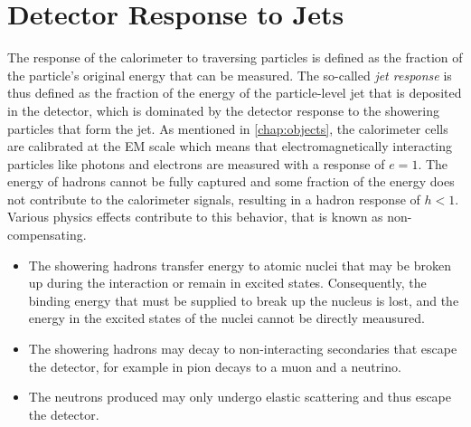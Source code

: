 




\section{Detector Response to Jets}
\label{sec:detector-response}
The response of the calorimeter to traversing particles is defined as the fraction of the particle's original energy that can be measured. The so-called \emph{jet response} is thus defined as the fraction of the energy of the particle-level jet that is deposited in the detector, which is dominated by the detector response to the showering particles that form the jet.
As mentioned in \cref{chap:objects}, the calorimeter cells are calibrated at the EM scale which means that electromagnetically interacting particles like photons and electrons are measured with a response of $e = 1$. The energy of hadrons cannot be fully captured and some fraction of the energy does not contribute to the calorimeter signals, resulting in a hadron response of $h < 1$. Various physics effects contribute to this behavior, that is known as non-compensating.
\begin{itemize}
    \item The showering hadrons transfer energy to atomic nuclei that may be broken up during the interaction or remain in excited states. Consequently, the binding energy that must be supplied to break up the nucleus is lost, and the energy in the excited states of the nuclei cannot be directly meausured. 
    \item The showering hadrons may decay to non-interacting secondaries that escape the detector, for example in pion decays to a muon and a neutrino.
    \item The neutrons produced may only undergo elastic scattering and thus escape the detector.
\end{itemize}

